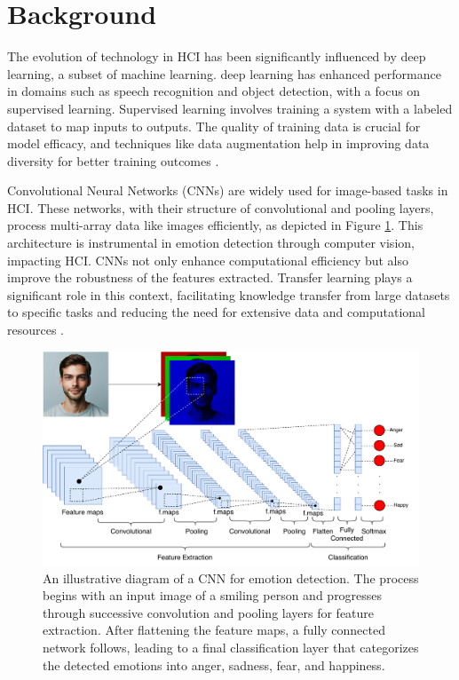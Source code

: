 \documentclass[runningheads]{llncs}
\begin{document}
\section{Background}
\label{sec:background}

The evolution of technology in HCI has been significantly influenced by deep learning, a subset of machine learning. deep learning has enhanced performance in domains such as speech recognition and object detection, with a focus on supervised learning. Supervised learning involves training a system with a labeled dataset to map inputs to outputs. The quality of training data is crucial for model efficacy, and techniques like data augmentation help in improving data diversity for better training outcomes \cite{Alrowais2023,Lecun2015}.

Convolutional Neural Networks (CNNs) are widely used for image-based tasks in HCI. These networks, with their structure of convolutional and pooling layers, process multi-array data like images efficiently, as depicted in Figure \ref{fig:cnnarchitecture}. This architecture is instrumental in emotion detection through computer vision, impacting HCI. CNNs not only enhance computational efficiency but also improve the robustness of the features extracted. Transfer learning plays a significant role in this context, facilitating knowledge transfer from large datasets to specific tasks and reducing the need for extensive data and computational resources \cite{Lecun2015, Khan2020}.

\begin{figure}[htb]
\centering
\includegraphics[width=0.97\linewidth]{CNNArchitecture.pdf}
\caption{An illustrative diagram of a CNN for emotion detection. The process begins with an input image of a smiling person and progresses through successive convolution and pooling layers for feature extraction. After flattening the feature maps, a fully connected network follows, leading to a final classification layer that categorizes the detected emotions into anger, sadness, fear, and happiness.}
\label{fig:cnnarchitecture}
\end{figure}
\end{document}
